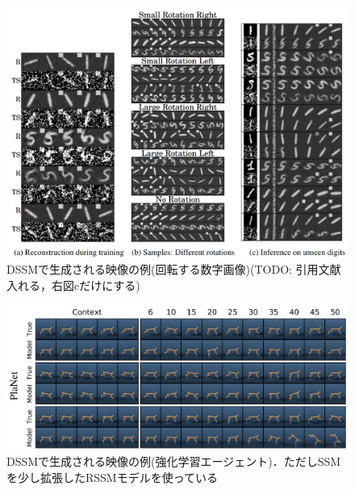 \begin{figure}[bp]
  \begin{center}
    \includegraphics[width=\linewidth]{./figures/dssm_dkf.png}
    \caption[DSSMで生成される映像の例(回転する数字画像)]{DSSMで生成される映像の例(回転する数字画像)(TODO: 引用文献入れる，右図cだけにする)}
    \label{fig:dssm_dkf}
  \end{center}
\end{figure}

\begin{figure}[tbp]
  \begin{center}
    \includegraphics[width=\linewidth]{./figures/dssm_planet.png}
    \caption[DSSMで生成される映像の例(強化学習エージェント)]{DSSMで生成される映像の例(強化学習エージェント)．ただしSSMを少し拡張したRSSMモデルを使っている}
    \label{fig:dssm_planet}
  \end{center}
\end{figure}

